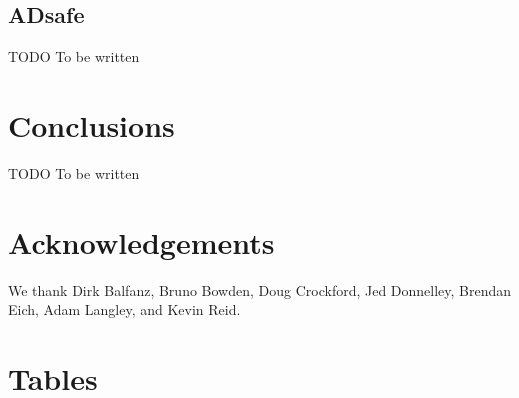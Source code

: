 \documentclass[letterpaper,twocolumn,10pt]{article}
\begin{document}
\subsection{ADsafe}

TODO To be written

\section{Conclusions}

TODO To be written

\section{Acknowledgements}

We thank 
Dirk Balfanz,
Bruno Bowden,
Doug Crockford,
Jed Donnelley,
Brendan Eich,
Adam Langley, and
Kevin Reid.

\appendix

\section{Tables}
\end{document}
